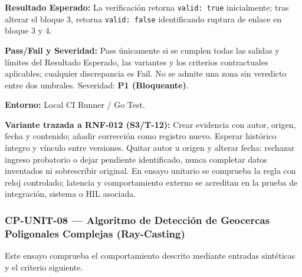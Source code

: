 \par\noindent\textbf{Resultado Esperado:} La verificación retorna \texttt{v\allowbreak{}a\allowbreak{}l\allowbreak{}i\allowbreak{}d\allowbreak{}:\allowbreak{} t\allowbreak{}r\allowbreak{}u\allowbreak{}e\allowbreak{}} inicialmente; tras alterar el bloque 3, retorna \texttt{v\allowbreak{}a\allowbreak{}l\allowbreak{}i\allowbreak{}d\allowbreak{}:\allowbreak{} f\allowbreak{}a\allowbreak{}l\allowbreak{}s\allowbreak{}e\allowbreak{}} identificando ruptura de enlace en bloque 3 y 4.\par
\par\noindent\textbf{Pass/Fail y Severidad:} Pass únicamente si se cumplen todas las salidas y límites del Resultado Esperado, las variantes y los criterios contractuales aplicables; cualquier discrepancia es Fail. No se admite una zona sin veredicto entre dos umbrales. Severidad: \textbf{P1 (Bloqueante)}.\par
\par\noindent\textbf{Entorno:} Local CI Runner / Go Test.\par







\par\noindent\textbf{Variante trazada a RNF-012 (S3/T-12):} Crear evidencia con autor, origen, fecha y contenido; añadir corrección como registro nuevo. Esperar histórico íntegro y vínculo entre versiones. Quitar autor u origen y alterar fecha: rechazar ingreso probatorio o dejar pendiente identificado, nunca completar datos inventados ni sobrescribir original. En ensayo unitario se comprueba la regla con reloj controlado; latencia y comportamiento externo se acreditan en la prueba de integración, sistema o HIL asociada.\par
\subsubsection*{CP-UNIT-08 — Algoritmo de Detección de Geocercas Poligonales Complejas (Ray-Casting)}\label{sec:9-cp-unit-08}
Este ensayo comprueba el comportamiento descrito mediante entradas sintéticas y el criterio siguiente.

